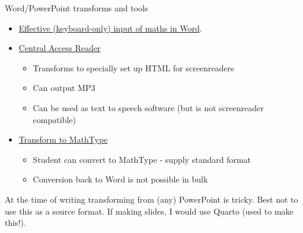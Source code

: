 \documentclass[
  ignorenonframetext,
]{beamer}
\providecommand{\tightlist}{%
  \setlength{\itemsep}{0pt}\setlength{\parskip}{0pt}}
\begin{document}
\begin{frame}{Word/PowerPoint transforms and tools}
\label{wordpowerpoint-transforms-and-tools}
\begin{itemize}
\tightlist
\item
  \href{https://bathmash.github.io/gettingstarted/Word/index.html}{Effective
  (keyboard-only) input of maths in Word}.
\item
  \href{https://www.cwu.edu/student-life/student-support/central-access/resources/reader.php}{Central
  Access Reader}

  \begin{itemize}
  \tightlist
  \item
    Transforms to specially set up HTML for screenreaders
  \item
    Can output MP3
  \item
    Can be used as text to speech software (but is not screenreader
    compatible)
  \end{itemize}
\item
  \href{https://www.wiris.com/en/mathtype/office-tools/}{Transform to
  MathType}

  \begin{itemize}
  \tightlist
  \item
    Student can convert to MathType - supply standard format
  \item
    Conversion back to Word is not possible in bulk
  \end{itemize}
\end{itemize}

At the time of writing transforming from (any) PowerPoint is tricky.
Best not to use this as a source format. If making slides, I would use
Quarto (used to make this!).
\end{frame}
\end{document}
